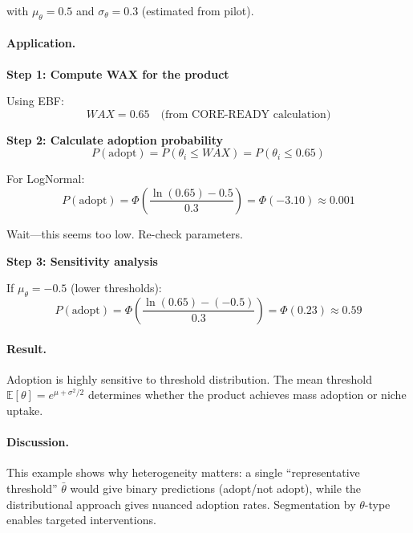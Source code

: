 with $\mu_\theta = 0.5$ and $\sigma_\theta = 0.3$ (estimated from pilot).

\paragraph{Application.}

\textbf{Step 1: Compute WAX for the product}

Using EBF:
\begin{equation}
WAX = 0.65 \quad \text{(from CORE-READY calculation)}
\end{equation}

\textbf{Step 2: Calculate adoption probability}
\begin{equation}
P(\text{adopt}) = P(\theta_i \leq WAX) = P(\theta_i \leq 0.65)
\end{equation}

For LogNormal:
\begin{equation}
P(\text{adopt}) = \Phi\left(\frac{\ln(0.65) - 0.5}{0.3}\right) = \Phi(-3.10) \approx 0.001
\end{equation}

Wait---this seems too low. Re-check parameters.

\textbf{Step 3: Sensitivity analysis}

If $\mu_\theta = -0.5$ (lower thresholds):
\begin{equation}
P(\text{adopt}) = \Phi\left(\frac{\ln(0.65) - (-0.5)}{0.3}\right) = \Phi(0.23) \approx 0.59
\end{equation}

\paragraph{Result.}

Adoption is highly sensitive to threshold distribution. The mean threshold
$\mathbb{E}[\theta] = e^{\mu + \sigma^2/2}$ determines whether the product
achieves mass adoption or niche uptake.

\paragraph{Discussion.}

This example shows why heterogeneity matters: a single ``representative
threshold'' $\bar{\theta}$ would give binary predictions (adopt/not adopt),
while the distributional approach gives nuanced adoption rates. Segmentation
by $\theta$-type enables targeted interventions.


